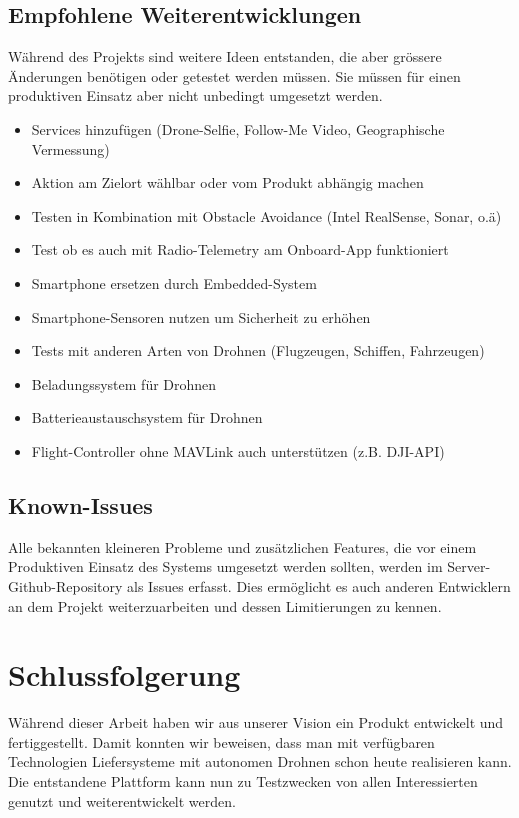 \subsection{Empfohlene Weiterentwicklungen}

Während des Projekts sind weitere Ideen entstanden, die aber grössere Änderungen benötigen oder getestet werden müssen. Sie müssen für einen produktiven Einsatz aber nicht unbedingt umgesetzt werden.

\begin{itemize}
	\item Services hinzufügen (Drone-Selfie, Follow-Me Video, Geographische Vermessung)
	\item Aktion am Zielort wählbar oder vom Produkt abhängig machen
	\item Testen in Kombination mit Obstacle Avoidance (Intel RealSense, Sonar, o.ä)
	\item Test ob es auch mit Radio-Telemetry am Onboard-App funktioniert
	\item Smartphone ersetzen durch Embedded-System 
	\item Smartphone-Sensoren nutzen um Sicherheit zu erhöhen
	\item Tests mit anderen Arten von Drohnen (Flugzeugen, Schiffen, Fahrzeugen)
	\item Beladungssystem für Drohnen
	\item Batterieaustauschsystem für Drohnen
	\item Flight-Controller ohne MAVLink auch unterstützen (z.B. DJI-API)
\end{itemize} 


\subsection{Known-Issues}

Alle bekannten kleineren Probleme und zusätzlichen Features, die vor einem Produktiven Einsatz des Systems umgesetzt werden sollten, werden im Server-Github-Repository als Issues erfasst. Dies ermöglicht es auch anderen Entwicklern an dem Projekt weiterzuarbeiten und dessen Limitierungen zu kennen.


\section{Schlussfolgerung}

Während dieser Arbeit haben wir aus unserer Vision ein Produkt entwickelt und fertiggestellt. Damit konnten wir beweisen, dass man mit verfügbaren Technologien Liefersysteme mit autonomen Drohnen schon heute realisieren kann. Die entstandene Plattform kann nun zu Testzwecken von allen Interessierten genutzt und weiterentwickelt werden.\\

